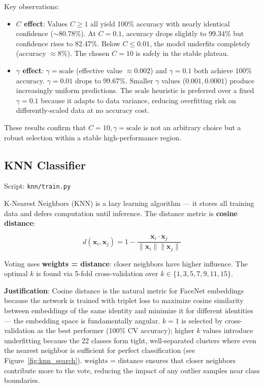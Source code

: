 \documentclass[12pt,a4paper]{article}
\begin{document}
Key observations:
\begin{itemize}
    \item \textbf{$C$ effect}: Values $C \ge 1$ all yield 100\% accuracy with nearly identical confidence ($\sim 80.78\%$). At $C = 0.1$, accuracy drops slightly to 99.34\% but confidence rises to 82.47\%. Below $C \le 0.01$, the model underfits completely (accuracy $\approx 8\%$). The chosen $C=10$ is safely in the stable plateau.
    \item \textbf{$\gamma$ effect}: $\gamma = \text{scale}$ (effective value $\approx 0.002$) and $\gamma = 0.1$ both achieve 100\% accuracy. $\gamma = 0.01$ drops to 99.67\%. Smaller $\gamma$ values ($0.001, 0.0001$) produce increasingly uniform predictions. The $\text{scale}$ heuristic is preferred over a fixed $\gamma = 0.1$ because it adapts to data variance, reducing overfitting risk on differently-scaled data at no accuracy cost.
\end{itemize}

These results confirm that $C=10, \gamma=\text{scale}$ is not an arbitrary choice but a robust selection within a stable high-performance region.

\subsection{KNN Classifier}
\label{subsec:knn}

Script: \texttt{knn/train.py}

K-Nearest Neighbors (KNN) \cite{knn} is a lazy learning algorithm --- it stores all training data and defers computation until inference. The distance metric is \textbf{cosine distance}:

\[
d(\mathbf{x}_i, \mathbf{x}_j) = 1 - \frac{\mathbf{x}_i \cdot \mathbf{x}_j}{\|\mathbf{x}_i\| \|\mathbf{x}_j\|}
\]

Voting uses \textbf{weights = distance}: closer neighbors have higher influence. The optimal $k$ is found via 5-fold cross-validation over $k \in \{1, 3, 5, 7, 9, 11, 15\}$.

\textbf{Justification}: Cosine distance is the natural metric for FaceNet embeddings because the network is trained with triplet loss to maximize cosine similarity between embeddings of the same identity and minimize it for different identities --- the embedding space is fundamentally angular. $k=1$ is selected by cross-validation as the best performer (100\% CV accuracy); higher $k$ values introduce underfitting because the 22 classes form tight, well-separated clusters where even the nearest neighbor is sufficient for perfect classification (see Figure~\ref{fig:knn_search}). $\text{weights = distance}$ ensures that closer neighbors contribute more to the vote, reducing the impact of any outlier samples near class boundaries.
\end{document}
